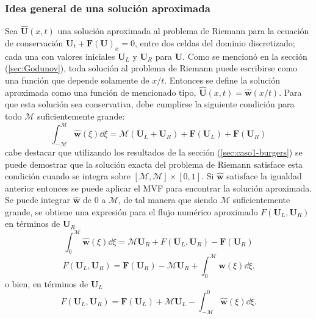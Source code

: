 \subsubsection{Idea general de una solución aproximada}
Sea $\mathbf{\hat{U}}(x,t)$ una solución aproximada al problema de Riemann para la ecuación de conservación $\mathbf{U}_t + \mathbf{F}(\mathbf{U})_x = 0$, entre dos celdas del dominio discretizado; cada una con valores iniciales $\mathbf{U}_L$ y $\mathbf{U}_R$ para $\mathbf{U}$. Como se mencionó en la sección (\ref{sec:Godunov}), toda solución al problema de Riemann puede escribirse como una función que depende solamente de $x/t$. Entonces se define la solución aproximada como una función de mencionado tipo, $\mathbf{\hat{U}}(x,t) = \mathbf{\hat{w}}(x/t)$. Para que esta solución sea conservativa, debe cumplirse la siguiente condición para todo $\mathcal{M}$ suficientemente grande:
\begin{equation}
	\int_{-\mathcal{M}}^{\mathcal{M}} \mathbf{\hat{w}}(\xi) \dd{\xi} = \mathcal{M} (\mathbf{U}_L + \mathbf{U}_R) + \mathbf{F}(\mathbf{U}_L) + \mathbf{F}(\mathbf{U}_R)
	\label{eq:condicion-aprox-riemann}
\end{equation}
cabe destacar que utilizando los resultados de la sección (\ref{sec:caso1-burgers}) se puede demostrar que la solución exacta del problema de Riemann satisface esta condición cuando se integra sobre $[\mathcal{M},\mathcal{M}]\times[0,1]$. Si $\mathbf{\hat{w}}$ satisface la igualdad anterior entonces se puede aplicar el MVF para encontrar la solución aproximada. Se puede integrar $\mathbf{\hat{w}}$ de $0$ a $\mathcal{M}$, de tal manera que siendo $\mathcal{M}$ suficientemente grande, se obtiene una expresión para el flujo numérico aproximado $F(\mathbf{U}_L,\mathbf{U}_R)$ en términos de $\mathbf{U}_R$
\begin{equation}
	\int_{0}^{\mathcal{M}} \mathbf{\hat{w}}(\xi) \dd{\xi} = \mathcal{M}\mathbf{U}_R + F(\mathbf{U}_L,\mathbf{U}_R) - \mathbf{F}(\mathbf{U}_R)
\end{equation}
\begin{equation}
	F(\mathbf{U}_L,\mathbf{U}_R) = \mathbf{F}(\mathbf{U}_R)- \mathcal{M}\mathbf{U}_R +\int_{0}^{\mathcal{M}} \mathbf{\hat{w}}(\xi) \dd{\xi}.
\end{equation}
o bien, en términos de $\mathbf{U}_L$
\begin{equation}
	F(\mathbf{U}_L,\mathbf{U}_R) = \mathbf{F}(\mathbf{U}_L)+ \mathcal{M}\mathbf{U}_L -\int_{-\mathcal{M}}^{0} \mathbf{\hat{w}}(\xi) \dd{\xi}.
\end{equation}
